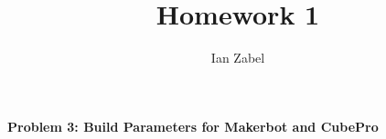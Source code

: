 \documentclass[10pt,a4paper]{article}
\author{Ian Zabel}
\title{Homework 1}
\begin{document}
\textbf{Problem 3: Build Parameters for Makerbot and CubePro}
\end{document}
